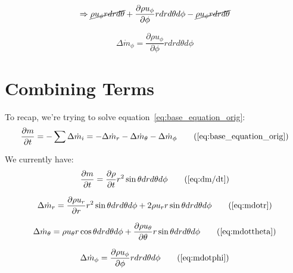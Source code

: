 \documentclass[12pt, letterpaper, twoside]{article}
\begin{document}
            \begin{equation*}
                \Rightarrow
                \cancel{\rho u_\phi r dr d\theta} + \frac{\partial \rho u_{\phi}}{\partial \phi} r dr d\theta d\phi -
                \cancel{\rho u_\phi r dr d\theta} 
            \end{equation*}

            \begin{equation}\label{eq:mdotphi}
                \boxed{\Delta\dot{m}_{\phi} = \frac{\partial \rho u_{\phi}}{\partial \phi} r dr d\theta d\phi }
            \end{equation}


\section{Combining Terms}\label{sect:combineterms}
To recap, we're trying to solve equation~\ref{eq:base_equation_orig}:
    \begin{equation}
        \frac{\partial m}{\partial t} = - \sum \Delta\dot{m}_i = -\Delta\dot{m}_r - \Delta\dot{m}_{\theta} - \Delta\dot{m}_{\phi} 
        \tag{\ref{eq:base_equation_orig}}
    \end{equation}

We currently have:
    \begin{equation}
        \frac{\partial m}{\partial t} = 
        \frac{\partial \rho}{\partial t} r^2 \sin\theta dr d\theta d\phi
        \tag{\ref{eq:dm/dt}}
    \end{equation}

    \begin{equation}
        \Delta\dot{m}_r = \frac{\partial \rho u_r}{\partial r} r^2 \sin\theta dr d\theta d\phi +
        2\rho u_r r\sin\theta dr d\theta d\phi
        \tag{\ref{eq:mdotr}}
    \end{equation}

    \begin{equation}
        \Delta\dot{m}_{\theta} = 
        \rho u_{\theta} r\cos\theta dr d\theta d\phi + 
        \frac{\partial\rho u_{\theta}}{\partial\theta} r\sin\theta dr d\theta d\phi
        \tag{\ref{eq:mdottheta}}
    \end{equation}

    \begin{equation}
        \Delta\dot{m}_{\phi} = \frac{\partial \rho u_{\phi}}{\partial \phi} r dr d\theta d\phi 
        \tag{\ref{eq:mdotphi}}
    \end{equation}
\end{document}
